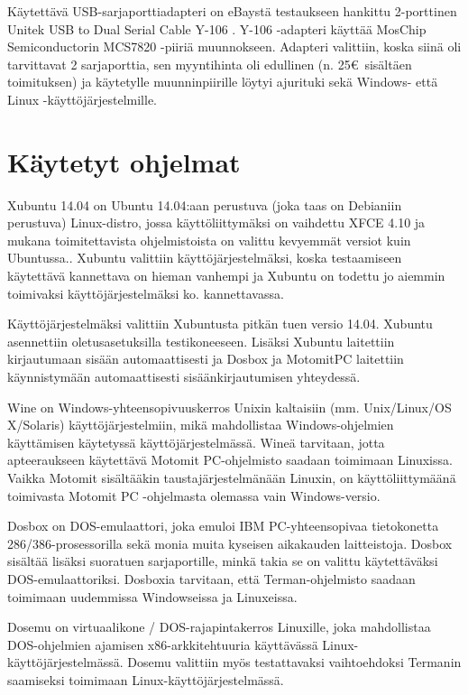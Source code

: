 Käytettävä USB-sarjaporttiadapteri on eBaystä testaukseen hankittu 2-porttinen Unitek USB to Dual Serial Cable Y-106 \cite{serial:unitek}. Y-106 -adapteri käyttää MosChip Semiconductorin MCS7820 -piiriä muunnokseen. Adapteri valittiin, koska siinä oli tarvittavat 2 sarjaporttia, sen myyntihinta oli edullinen (n. 25€ sisältäen toimituksen) ja käytetylle muunninpiirille löytyi ajurituki sekä Windows- että Linux -käyttöjärjestelmille.


\section{Käytetyt ohjelmat}

Xubuntu 14.04 on Ubuntu 14.04:aan perustuva (joka taas on Debianiin perustuva) Linux-distro, jossa
käyttöliittymäksi on vaihdettu XFCE 4.10 ja mukana toimitettavista ohjelmistoista on valittu kevyemmät
versiot kuin Ubuntussa.\cite{xubuntu:about}. Xubuntu valittiin käyttöjärjestelmäksi, koska testaamiseen
käytettävä kannettava on hieman vanhempi ja Xubuntu on todettu jo aiemmin toimivaksi käyttöjärjestelmäksi ko. kannettavassa.

Käyttöjärjestelmäksi valittiin Xubuntusta pitkän tuen versio 14.04.
Xubuntu asennettiin oletusasetuksilla testikoneeseen. Lisäksi Xubuntu
laitettiin kirjautumaan sisään automaattisesti ja Dosbox ja MotomitPC
laitettiin käynnistymään automaattisesti sisäänkirjautumisen yhteydessä.

Wine on Windows-yhteensopivuuskerros Unixin kaltaisiin (mm. Unix/Linux/OS X/Solaris) käyttöjärjestelmiin, mikä mahdollistaa Windows-ohjelmien käyttämisen käytetyssä käyttöjärjestelmässä. Wineä tarvitaan, jotta apteeraukseen käytettävä Motomit PC-ohjelmisto saadaan toimimaan Linuxissa. Vaikka Motomit sisältääkin taustajärjestelmänään Linuxin\cite{motomit:manual}, on käyttöliittymäänä toimivasta Motomit PC -ohjelmasta olemassa vain Windows-versio.

Dosbox on DOS-emulaattori, joka emuloi IBM PC-yhteensopivaa tietokonetta 286/386-prosessorilla sekä monia muita kyseisen aikakauden laitteistoja. Dosbox sisältää lisäksi suoratuen sarjaportille, minkä takia se on valittu käytettäväksi DOS-emulaattoriksi. Dosboxia tarvitaan, että Terman-ohjelmisto saadaan toimimaan uudemmissa Windowseissa ja Linuxeissa.

Dosemu on virtuaalikone / DOS-rajapintakerros Linuxille, joka mahdollistaa DOS-ohjelmien ajamisen x86-arkkitehtuuria käyttävässä Linux-käyttöjärjestelmässä. Dosemu valittiin myös testattavaksi vaihtoehdoksi Termanin saamiseksi toimimaan Linux-käyttöjärjestelmässä.

